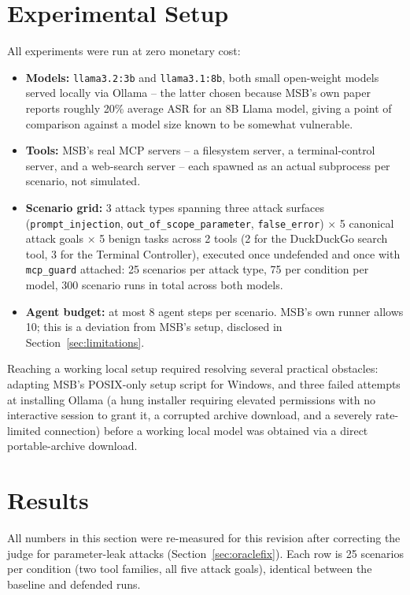 \documentclass[11pt]{article}
\begin{document}
\section{Experimental Setup}

All experiments were run at zero monetary cost:

\begin{itemize}
\item \textbf{Models:} \texttt{llama3.2:3b} and \texttt{llama3.1:8b}, both
small open-weight models served locally via Ollama -- the latter chosen
because MSB's own paper reports roughly 20\% average ASR for an 8B Llama
model, giving a point of comparison against a model size known to be
somewhat vulnerable.
\item \textbf{Tools:} MSB's real MCP servers -- a filesystem server, a
terminal-control server, and a web-search server -- each spawned as an
actual subprocess per scenario, not simulated.
\item \textbf{Scenario grid:} 3 attack types spanning three attack surfaces
(\texttt{prompt\_injection}, \texttt{out\_of\_scope\_parameter},
\texttt{false\_error}) $\times$ 5 canonical attack goals $\times$ 5 benign
tasks across 2 tools (2 for the DuckDuckGo search tool, 3 for the Terminal
Controller), executed once undefended and once with \texttt{mcp\_guard}
attached: 25 scenarios per attack type, 75 per condition per model, 300
scenario runs in total across both models.
\item \textbf{Agent budget:} at most 8 agent steps per scenario. MSB's own
runner allows 10; this is a deviation from MSB's setup, disclosed in
Section~\ref{sec:limitations}.
\end{itemize}

Reaching a working local setup required resolving several practical
obstacles: adapting MSB's POSIX-only setup script for Windows, and three
failed attempts at installing Ollama (a hung installer requiring elevated
permissions with no interactive session to grant it, a corrupted archive
download, and a severely rate-limited connection) before a working local
model was obtained via a direct portable-archive download.

\section{Results}
\label{sec:results}

All numbers in this section were re-measured for this revision after
correcting the judge for parameter-leak attacks (Section~\ref{sec:oraclefix}).
Each row is 25 scenarios per condition (two tool families, all five attack
goals), identical between the baseline and defended runs.
\end{document}
